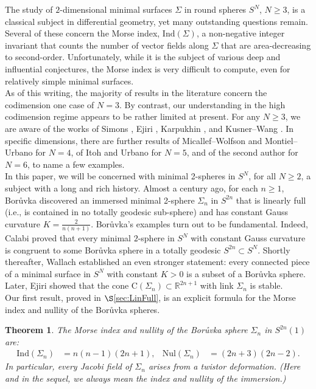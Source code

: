 \documentclass[11pt]{article}
\newcommand{\R}{\mathbb{R}}
\newtheorem{thm}{Theorem}[section]
\theoremstyle{definition}
\numberwithin{equation}{section}
\begin{document}
\indent \indent The study of $2$-dimensional minimal surfaces $\Sigma$ in round spheres $S^N$, $N \geq 3$, is a classical subject in differential geometry, yet many outstanding questions remain.  Several of these concern the Morse index, $\mathrm{Ind}(\Sigma)$, a non-negative integer invariant that counts the number of vector fields along $\Sigma$ that are area-decreasing to second-order.  Unfortunately, while it is the subject of various deep and influential conjectures, the Morse index is very difficult to compute, even for relatively simple minimal surfaces. \\
\indent As of this writing, the majority of results in the literature concern the codimension one case of $N = 3$.  By contrast, our understanding in the high codimension regime appears to be rather limited at present.  For any $N \geq 3$, we are aware of the works of Simons \cite{Simons68}, Ejiri \cite{Ejiri83}, Karpukhin \cite{Karpukhin21}, and Kusner--Wang \cite{KusWang24}.  In specific dimensions, there are further results of Micallef--Wolfson \cite{MicaWolf93} and Montiel--Urbano \cite{MontUrb97} for $N = 4$, of Itoh \cite{Itoh00} and Urbano \cite{Urbano03} for $N = 5$, and of the second author \cite{Madnick22} for $N = 6$, to name a few examples. \\
\indent In this paper, we will be concerned with minimal 2-spheres in $S^N$, for all $N \geq 2$, a subject with a long and rich history.  Almost a century ago, for each $n \geq 1$, Bor{\r{u}}vka \cite{Boruvka33} discovered an immersed minimal 2-sphere $\Sigma_n$ in $S^{2n}$ that is linearly full (i.e., is contained in no totally geodesic sub-sphere) and has constant Gauss curvature $K = \frac{2}{n(n+1)}$.  Bor{\r{u}}vka’s examples turn out to be fundamental.  Indeed, Calabi \cite{Calabi67} proved that every minimal $2$-sphere in $S^N$ with constant Gauss curvature is congruent to some Bor{\r{u}}vka sphere in a totally geodesic $S^{2n} \subset S^N$.  Shortly thereafter, Wallach \cite{Wallach70} established an even stronger statement: every connected piece of a minimal surface in $S^N$ with constant $K > 0$ is a subset of a Bor{\r{u}}vka sphere.  Later, Ejiri \cite{Ejiri86} showed that the cone $\mathrm{C}(\Sigma_n) \subset \R^{2n+1}$ with link $\Sigma_n$ is stable. \\
\indent Our first result, proved in $\S$\ref{sec:LinFull}, is an explicit formula for the Morse index and nullity of the Bor{\r{u}}vka spheres.


\begin{thm} \label{thm:BoruvkaFull} The Morse index and nullity of the Bor{\r{u}}vka sphere $\Sigma_n$ in $S^{2n}(1)$ are:
\begin{align*}
\mathrm{Ind}(\Sigma_n) & = n(n-1)(2n+1), & \mathrm{Nul}(\Sigma_n) & = (2n+3)(2n-2).
\end{align*}
In particular, every Jacobi field of $\Sigma_n$ arises from a twistor deformation.  (Here and in the sequel, we always mean the index and nullity of the immersion.)
\end{thm}
\end{document}
